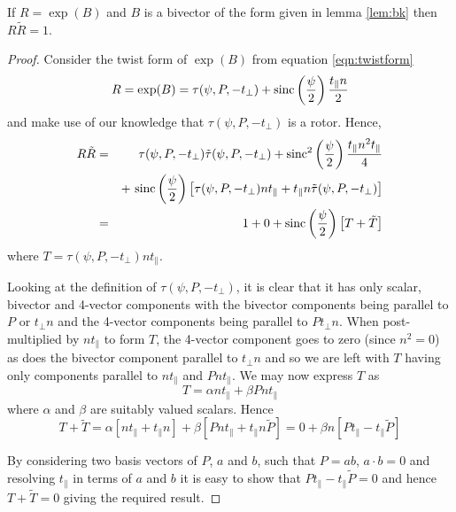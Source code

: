 \begin{thm} If $R = \exp(B)$ and $B$ is a bivector of the form 
given in lemma
\ref{lem:bk} then $R\tilde{R} = 1$.
\end{thm}
\begin{proof}
Consider the twist form of $\exp(B)$ from equation \ref{eqn:twistform}
\[
R = \exp(B) =
\tau(\psi, P, - t_\perp) + \mathrm{sinc}\left(\frac{\psi}{2}\right)\frac{t_\parallel n}{2}
\]
and make use of our knowledge that $\tau(\psi, P, - t_\perp)$ is a rotor.
Hence,
\begin{eqnarray*}
R\tilde{R} & = & \tau(\psi, P, - t_\perp)\tilde{\tau}(\psi, P, - t_\perp)
+ \mathrm{sinc}^2\left(\frac{\psi}{2}\right)
\frac{t_\parallel n^2 t_\parallel}{4}\\
&& + \ \mathrm{sinc}\left(\frac{\psi}{2}\right)
\left[ \tau(\psi, P, - t_\perp)nt_\parallel + 
       t_\parallel n\tilde{\tau}(\psi, P, - t_\perp) \right] \\
& = & 1 + 0 + \mathrm{sinc}\left(\frac{\psi}{2}\right)
\left[ T + \tilde{T} \right]
\end{eqnarray*}
where $T = \tau(\psi, P, - t_\perp)nt_\parallel$.

Looking at the definition of $\tau(\psi, P, - t_\perp)$, it is clear
that it has only scalar, bivector and 4-vector components with
the bivector components being parallel to $P$ or $t_\perp n$ and
the 4-vector components being parallel to $Pt_\perp n$. When
post-multiplied by $nt_\parallel$ to form $T$, the 4-vector component
goes to zero (since $n^2 = 0$) as does the bivector component
parallel to $t_\perp n$ and so we are left with $T$ having only
components parallel to $nt_\parallel$ and $Pnt_\parallel$. 
We may now express $T$ as
\[
T = \alpha nt_\parallel + \beta Pnt_\parallel
\]
where $\alpha$ and $\beta$ are suitably valued scalars. Hence
\[
T + \tilde{T} = \alpha \left[ nt_\parallel + t_\parallel n \right]
+ \beta \left[ Pnt_\parallel + t_\parallel n\tilde{P} \right] 
= 0 + \beta n \left[ Pt_\parallel - t_\parallel \tilde{P} \right]
\]

By considering two basis vectors of $P$, $a$ and $b$, such
that $P = ab$, $a \cdot b = 0$ and resolving $t_\parallel$ in 
terms of $a$ and $b$ it is easy to show that 
$Pt_\parallel - t_\parallel\tilde{P} = 0$ and hence
$T + \tilde{T} = 0$ giving the required result.
\end{proof}


